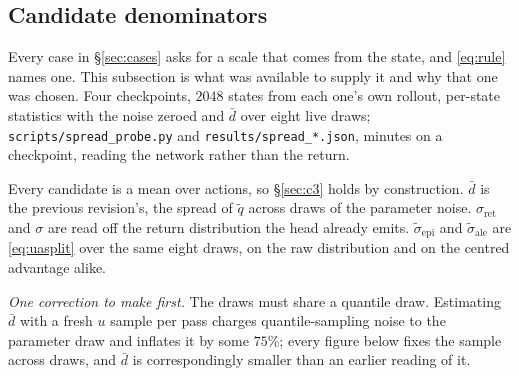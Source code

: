 \documentclass{article}
\newcommand{\dbar}{\bar{d}}
\newcommand{\sret}{\sigma_{\mathrm{ret}}}
\newcommand{\srank}{\sigma}
\begin{document}
\subsection{Candidate denominators}
\label{sec:denoms}

Every case in \S\ref{sec:cases} asks for a scale that comes from the state, and \eqref{eq:rule}
names one. This subsection is what was available to supply it and why that one was chosen. Four checkpoints, $2048$ states from each one's own rollout, per-state statistics
with the noise zeroed and $\dbar$ over eight live draws; \texttt{scripts/spread\_probe.py} and
\texttt{results/spread\_*.json}, minutes on a checkpoint, reading the network rather than the
return.

Every candidate is a mean over actions, so \S\ref{sec:c3} holds by construction. $\dbar$ is the
previous revision's, the spread of $\tilde{q}$ across draws of the parameter noise. $\sret$ and
$\srank$ are read off the return distribution the head already emits. $\tilde\sigma_{\mathrm{epi}}$
and $\tilde\sigma_{\mathrm{ale}}$ are \eqref{eq:uasplit} over the same eight draws, on the raw
distribution and on the centred advantage alike.

\emph{One correction to make first.} The draws must share a quantile draw. Estimating $\dbar$
with a fresh $u$ sample per pass charges quantile-sampling noise to the parameter draw and
inflates it by some $75\%$; every figure below fixes the sample across draws, and $\dbar$ is
correspondingly smaller than an earlier reading of it.
\end{document}

